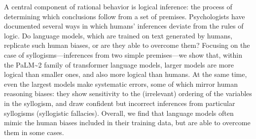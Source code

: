 A central component of rational behavior is logical inference: the process of determining which conclusions follow from a set of premises. Psychologists have documented several ways in which humans' inferences deviate from the rules of logic. Do language models, which are trained on text generated by humans, replicate such human biases, or are they able to overcome them? Focusing on the case of syllogisms---inferences from two simple premises---we show that, within the PaLM\textasciitilde{}2 family of transformer language models, larger models are more logical than smaller ones, and also more logical than humans. At the same time, even the largest models make systematic errors, some of which mirror human reasoning biases: they show sensitivity to the (irrelevant) ordering of the variables in the syllogism, and draw confident but incorrect inferences from particular syllogisms (syllogistic fallacies). Overall, we find that language models often mimic the human biases included in their training data, but are able to overcome them in some cases.